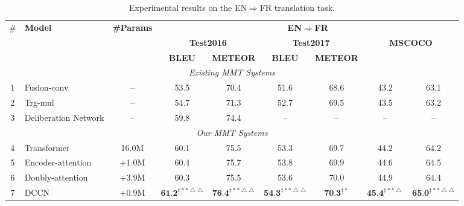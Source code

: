\documentclass[sigconf]{acmart}
\begin{document}
\begin{table*}
\centering
\footnotesize
\begin{tabular}{c|l|c|cc|cc|cc}  
\hline
\multirow{3}{*}{\#} & \multirow{3}{*}{\bf Model} & \multirow{3}{*}{\bf\#Params} &\multicolumn{6}{c}{\textbf{EN$\Rightarrow$FR}}\\
\cline{4-9}
& & &\multicolumn{2}{|c|}{\textbf{Test2016}} &\multicolumn{2}{|c|}{\textbf{Test2017}} &\multicolumn{2}{c}{\textbf{MSCOCO}}\\
\cline{4-9}
& & &\textbf{BLEU} & \textbf{METEOR} &\textbf{BLEU} & \textbf{METEOR} \\
\hline
\hline
\multicolumn{9}{c}{\emph{Existing MMT Systems}} \\
\hline
1 & Fusion-conv          \cite{caglayan2017lium} & -- & 53.5 & 70.4  & 51.6 & 68.6  & 43.2 & 63.1 \\
2 & Trg-mul              \cite{caglayan2017lium} & -- & 54.7 & 71.3  & 52.7 & 69.5  & 43.5 & 63.2  \\
3 & Deliberation Network \cite{acl19:twopass}    & -- & 59.8 & 74.4  & --   & --    & -- & --  \\
\hline
\multicolumn{9}{c}{\emph{Our MMT Systems}} \\
\hline
4 &Transformer \cite{vaswani2017attention}           &16.0M  & 60.1 & 75.5  & 53.3 & 69.7  & 44.2 & 64.2   \\
5 &Encoder-attention \cite{Delbrouck:NIPS17workshop} & +1.0M & 60.4 & 75.7  & 53.8 & 69.9  & 44.6 & 64.5    \\
6 &Doubly-attention \cite{helcl2018cuni}             & +3.9M & 60.3 & 75.5  & 53.6 & 70.0  & 44.9 & 64.4   \\
\hline
7 &DCCN & +0.9M  
& $\textbf{61.2}^{\ddagger**\bigtriangleup\bigtriangleup}$  & $\textbf{76.4}^{\ddagger**\bigtriangleup\bigtriangleup}$   
& $\textbf{54.3}^{\ddagger**\bigtriangleup\bigtriangleup}$  & $\textbf{70.3}^{\ddagger*}$ 
& $\textbf{45.4}^{\ddagger**\bigtriangleup}$  &$\textbf{65.0}^{\ddagger**\bigtriangleup\bigtriangleup}$ \\
\hline
\end{tabular}
\caption{
\label{Table_En2Fr}
Experimental results on the EN$\Rightarrow$FR translation task.
\vspace{-10pt}
}
\end{table*}
\end{document}
